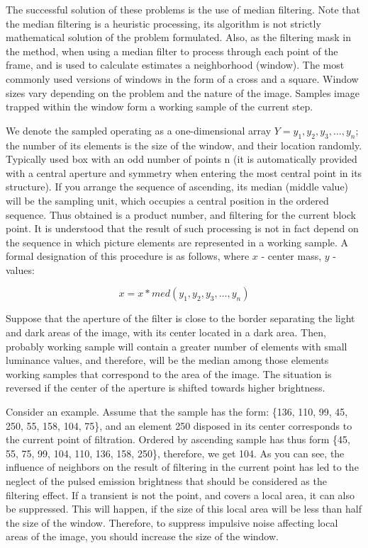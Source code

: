 The successful solution of these problems is the use of median filtering. Note that the median filtering is a heuristic processing, its algorithm is not strictly mathematical solution of the problem formulated. Also, as the filtering mask in the method, when using a median filter to process through each point of the frame, and is used to calculate estimates a neighborhood (window). The most commonly used versions of windows in the form of a cross and a square. Window sizes vary depending on the problem and the nature of the image. Samples image trapped within the window form a working sample of the current step.

We denote the sampled operating as a one-dimensional array $Y= {y_1,y_2,y_3,\dots, y_n}$; the number of its elements is the size of the window, and their location randomly. Typically used box with an odd number of points n (it is automatically provided with a central aperture and symmetry when entering the most central point in its structure). If you arrange the sequence of ascending, its median (middle value) will be the sampling unit, which occupies a central position in the ordered sequence. Thus obtained is a product number, and filtering for the current block point. It is understood that the result of such processing is not in fact depend on the sequence in which picture elements are represented in a working sample. A formal designation of this procedure is as follows, where $x$ - center mass, $y$ - values:

\begin{equation}
    x = x * med(y_1,y_2,y_3,\dots,y_n)
\end{equation}

Suppose that the aperture of the filter is close to the border separating the light and dark areas of the image, with its center located in a dark area. Then, probably working sample will contain a greater number of elements with small luminance values, and therefore, will be the median among those elements working samples that correspond to the area of the image. The situation is reversed if the center of the aperture is shifted towards higher brightness.

Consider an example. Assume that the sample has the form: \{136, 110, 99, 45, 250, 55, 158, 104, 75\}, and an element 250 disposed in its center corresponds to the current point of filtration. Ordered by ascending sample has thus form \{45, 55, 75, 99, 104, 110, 136, 158, 250\}, therefore, we get 104. As you can see, the influence of neighbors on the result of filtering in the current point has led to the neglect of the pulsed emission brightness that should be considered as the filtering effect. If a transient is not the point, and covers a local area, it can also be suppressed. This will happen, if the size of this local area will be less than half the size of the window. Therefore, to suppress impulsive noise affecting local areas of the image, you should increase the size of the window.



